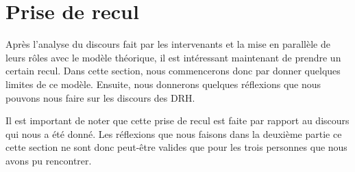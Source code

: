\section{Prise de recul}

Après l'analyse du discours fait par les intervenants et la mise en parallèle de leurs rôles avec le modèle théorique, il est intéressant maintenant de prendre un certain recul. Dans cette section, nous commencerons donc par donner quelques limites de ce modèle. Ensuite, nous donnerons quelques  réflexions que nous pouvons nous faire sur les discours des DRH.\newline

Il est important de noter que cette prise de recul est faite par rapport au discours qui nous a été donné. Les réflexions que nous faisons dans la deuxième partie ce cette section ne sont donc peut-être valides que pour les trois personnes que nous avons pu rencontrer. \newline